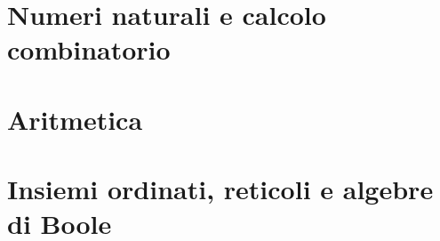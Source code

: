 \documentclass{unina_doc_class}
\begin{document}
  

  


  \part{Numeri naturali e calcolo combinatorio}

  

  

  


  \part{Aritmetica}

  

  

  


  \part{Insiemi ordinati, reticoli e algebre di Boole}

  

  

  
\end{document}

